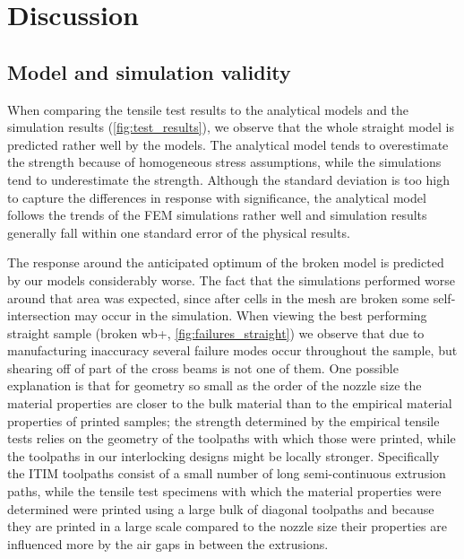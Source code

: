 \section{Discussion}
\subsection{Model and simulation validity}

When comparing the tensile test results to the analytical models and the simulation results (\cref{fig:test_results}),
we observe that the whole straight model is predicted rather well by the models.
The analytical model tends to overestimate the strength because of homogeneous stress assumptions,
while the simulations tend to underestimate the strength.
Although the standard deviation is too high to capture the differences in response with significance,
the analytical model follows the trends of the FEM simulations rather well and simulation results generally fall within one standard error of the physical results.

The response around the anticipated optimum of the broken model is predicted by our models considerably worse.
The fact that the simulations performed worse around that area was expected, since after cells in the mesh are broken some self-intersection may occur in the simulation.
When viewing the best performing straight sample (broken wb+, \cref{fig:failures_straight}) we observe that due to manufacturing inaccuracy several failure modes occur throughout the sample,
but shearing off of part of the cross beams is not one of them.
One possible explanation is that for geometry so small as the order of the nozzle size the material properties are closer to the bulk material than to the empirical material properties of printed samples;
the strength determined by the empirical tensile tests relies on the geometry of the toolpaths with which those were printed, while the toolpaths in our interlocking designs might be locally stronger.
Specifically the ITIM toolpaths consist of a small number of long semi-continuous extrusion paths, while %
the tensile test specimens with which the material properties were determined were printed using a large bulk of diagonal toolpaths
and because they are printed in a large scale compared to the nozzle size their properties are influenced more by the air gaps in between the extrusions.

